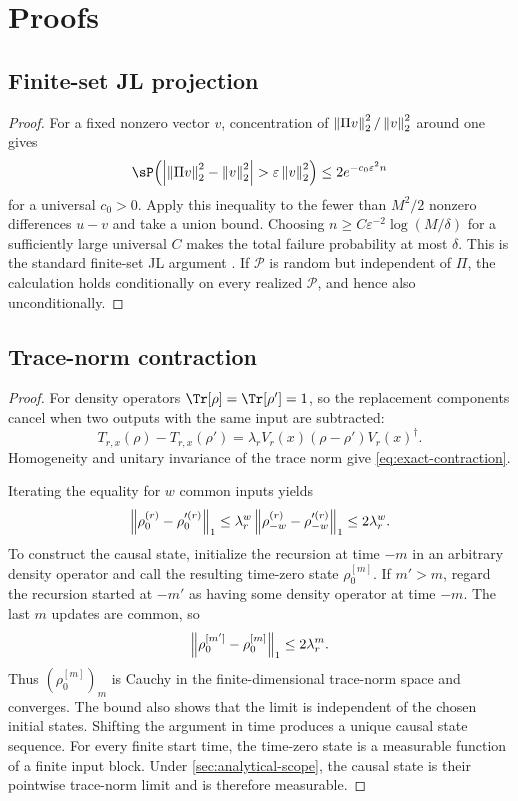 \section{Proofs}
\label{app:proofs}

\subsection{Finite-set JL projection}

\begin{proof}
For a fixed nonzero vector \(v\), concentration of
\(\left\lVert\Pi v\right\rVert_2^2/\left\lVert v\right\rVert_2^2\) around one gives
\[
    \Prob\!\left(
      \abs{\norm{\Pi v}_2^2-\norm v_2^2}
      >\varepsilon\norm v_2^2
    \right)
    \leq 2e^{-c_0\varepsilon^2n}
\]
for a universal \(c_0>0\). Apply this inequality to the fewer than \(M^2/2\)
nonzero differences \(u-v\) and take a union bound. Choosing
\(n\geq C\varepsilon^{-2}\log(M/\delta)\) for a sufficiently large universal
\(C\) makes the total failure probability at most \(\delta\). This is the
standard finite-set JL argument \citep{DasguptaGupta2003,Woodruff2014}. If
\(\mathcal P\) is random but independent of \(\Pi\), the calculation holds
conditionally on every realized \(\mathcal P\), and hence also unconditionally.
\end{proof}

\subsection{Trace-norm contraction}

\begin{proof}
For density operators \(\Tr[\rho]=\Tr[\rho']=1\), so the replacement
components cancel when two outputs with the same input are subtracted:
\[
    T_{r,x}(\rho)-T_{r,x}(\rho')
    =
    \lambda_rV_r(x)(\rho-\rho')V_r(x)^\dagger.
\]
Homogeneity and unitary invariance of the trace norm give
\cref{eq:exact-contraction}.

Iterating the equality for \(w\) common inputs yields
\[
    \left\lVert\rho_0^{(r)}-\rho_0^{\prime(r)}\right\rVert_{1}
    \leq
    \lambda_r^w
    \left\lVert\rho_{-w}^{(r)}-\rho_{-w}^{\prime(r)}\right\rVert_{1}
    \leq2\lambda_r^w.
\]
To construct the causal state, initialize the recursion at time \(-m\) in an
arbitrary density operator and call the resulting time-zero state
\(\rho_0^{[m]}\). If \(m'>m\), regard the recursion started at \(-m'\) as
having some density operator at time \(-m\). The last \(m\) updates are common,
so
\[
    \left\lVert\rho_0^{[m']}-\rho_0^{[m]}\right\rVert_{1}
    \leq2\lambda_r^m.
\]
Thus \((\rho_0^{[m]})_m\) is Cauchy in the finite-dimensional trace-norm
space and converges. The bound also shows that the limit is independent of
the chosen initial states. Shifting the argument in time produces a unique
causal state sequence. For every finite start time, the time-zero state is a
measurable function of a finite input block. Under
\cref{sec:analytical-scope}, the causal state is their pointwise trace-norm
limit and is therefore measurable.
\end{proof}

